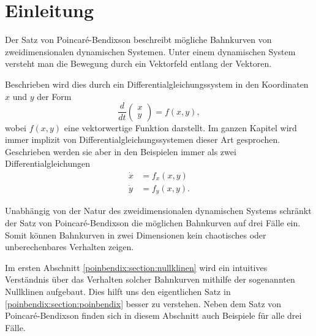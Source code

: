 \section{Einleitung} \label{poinbendix:section:einleitung}

Der Satz von Poincaré-Bendixson beschreibt mögliche Bahnkurven von zweidimensionalen dynamischen Systemen.
Unter einem dynamischen System versteht man die Bewegung durch ein Vektorfeld entlang der Vektoren.

Beschrieben wird dies durch ein Differentialgleichungssystem in den Koordinaten $x$ und $y$ der Form
\begin{equation} \label{poinbendix:equation:grundform}
\frac{d}{dt}
\begin{pmatrix}x\\y\end{pmatrix}
=
f(x,y),
\end{equation}
wobei $f(x,y)$ eine vektorwertige Funktion darstellt.
Im ganzen Kapitel wird immer implizit von Differentialgleichungssystemen dieser Art gesprochen.
Geschrieben werden sie aber in den Beispielen immer als zwei Differentialgleichungen
\begin{align*}
    \dot{x} &= f_x(x, y) \\
    \dot{y} &= f_y(x, y).
\end{align*}

Unabhängig von der Natur des zweidimensionalen dynamischen Systems schränkt der Satz von Poincaré-Bendixson die möglichen Bahnkurven auf drei Fälle ein.
Somit können Bahnkurven in zwei Dimensionen kein chaotisches oder unberechenbares Verhalten zeigen.

Im ersten Abschnitt \ref{poinbendix:section:nullklinen} wird ein intuitives Verständnis über das Verhalten solcher Bahnkurven mithilfe der sogenannten Nullklinen aufgebaut.
Dies hilft uns den eigentlichen Satz in \ref{poinbendix:section:poinbendix} besser zu verstehen.
Neben dem Satz von Poincaré-Bendixson finden sich in diesem Abschnitt auch Beispiele für alle drei Fälle.
